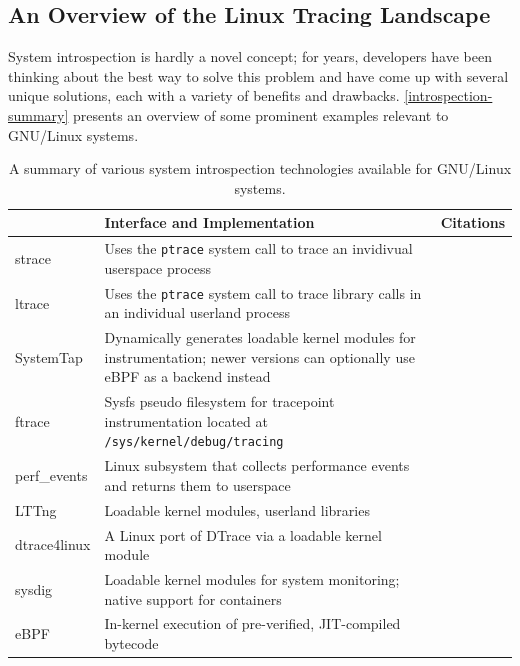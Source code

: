 \documentclass[
  12pt]{findlay}
\begin{document}
\hypertarget{an-overview-of-the-linux-tracing-landscape}{%
\subsection{An Overview of the Linux Tracing
Landscape}\label{an-overview-of-the-linux-tracing-landscape}}

\label{tracing-section}

System introspection is hardly a novel concept; for years, developers
have been thinking about the best way to solve this problem and have
come up with several unique solutions, each with a variety of benefits
and drawbacks. \autoref{introspection-summary} presents an overview of
some prominent examples relevant to GNU/Linux systems.

\begin{table}[p]
\caption{A summary of various system introspection technologies available for GNU/Linux systems.}
\label{introspection-summary}
\begin{center}
\begin{tabular}{>{\ttfamily}lp{3.8in}l}
    \toprule
\multicolumn{1}{l}{name} & Interface and Implementation & Citations\\
    \midrule
strace & Uses the \texttt{ptrace} system call to trace an invidivual userspace process & \cite{strace, manstrace}  \\
ltrace & Uses the \texttt{ptrace} system call to trace library calls in an individual userland process & \cite{rubirabranco07, manltrace}  \\
SystemTap & Dynamically generates loadable kernel modules for instrumentation; newer versions can optionally use eBPF as a backend instead &  \cite{systemtap, merey17}\\
ftrace & Sysfs pseudo filesystem for tracepoint instrumentation located at \texttt{/sys/kernel/debug/tracing} & \cite{ftrace}\\
perf\_events & Linux subsystem that collects performance events and returns them to userspace & \cite{manperfeventopen}  \\
LTTng & Loadable kernel modules, userland libraries & \cite{lttng}\\
dtrace4linux & A Linux port of DTrace via a loadable kernel module & \cite{dtrace4linux} \\
sysdig & Loadable kernel modules for system monitoring; native support for containers & \cite{sysdig} \\
eBPF & In-kernel execution of pre-verified, JIT-compiled bytecode & \cite{bcc, goldstein16, starovoitov13, starovoitov14} \\
    \bottomrule
\end{tabular}
\end{center}
\end{table}
\end{document}
